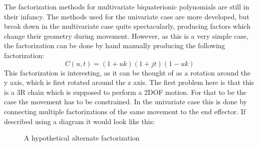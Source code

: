 The factorization methods for multivariate biquaterionic polynomials are still in their infancy\cite{ lercher2021multiplication, Lercher_2022 }. The methods used for the univariate case are more developed, but break down in the multivariate case quite spectacularly, producing factors which change their geometry during movement. However, as this is a very simple case, the factorization can be done by hand manually producing the following factorization:
\begin{equation}
    C(u,t) = (1+uk)(1+jt)(1-uk)
\end{equation}
This factorization is interesting, as it can be thought of as a rotation around the y axis, which is first rotated around the z axis. 
The first problem here is that this is a 3R chain which is supposed to perform a 2DOF motion. For that to be the case the movement has to be constrained. In the univariate case this is done by connecting multiple factorizations of the same movement  to the end effector. If described using a diagram it would look like this:

\begin{figure}[h!]
\begin{center}
\caption{A hypothetical alternate factorization}
\label{}
\end{center}
\end{figure}



